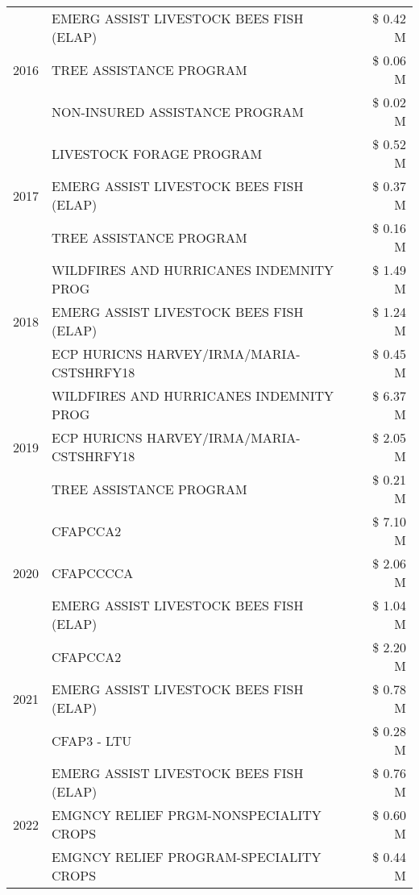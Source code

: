 \begin{tabular}{llr}
\multirow[t]{3}{*}{2016} & EMERG ASSIST LIVESTOCK BEES FISH (ELAP) & \$ 0.42 M \\
 & TREE ASSISTANCE PROGRAM & \$ 0.06 M \\
 & NON-INSURED ASSISTANCE PROGRAM & \$ 0.02 M \\
\cline{1-3}
\multirow[t]{3}{*}{2017} & LIVESTOCK FORAGE PROGRAM & \$ 0.52 M \\
 & EMERG ASSIST LIVESTOCK BEES FISH (ELAP) & \$ 0.37 M \\
 & TREE ASSISTANCE PROGRAM & \$ 0.16 M \\
\cline{1-3}
\multirow[t]{3}{*}{2018} & WILDFIRES AND HURRICANES INDEMNITY PROG & \$ 1.49 M \\
 & EMERG ASSIST LIVESTOCK BEES FISH (ELAP) & \$ 1.24 M \\
 & ECP HURICNS HARVEY/IRMA/MARIA-CSTSHRFY18 & \$ 0.45 M \\
\cline{1-3}
\multirow[t]{3}{*}{2019} & WILDFIRES AND HURRICANES INDEMNITY PROG & \$ 6.37 M \\
 & ECP HURICNS HARVEY/IRMA/MARIA-CSTSHRFY18 & \$ 2.05 M \\
 & TREE ASSISTANCE PROGRAM & \$ 0.21 M \\
\cline{1-3}
\multirow[t]{3}{*}{2020} & CFAPCCA2 & \$ 7.10 M \\
 & CFAPCCCCA & \$ 2.06 M \\
 & EMERG ASSIST LIVESTOCK BEES FISH (ELAP) & \$ 1.04 M \\
\cline{1-3}
\multirow[t]{3}{*}{2021} & CFAPCCA2 & \$ 2.20 M \\
 & EMERG ASSIST LIVESTOCK BEES FISH (ELAP) & \$ 0.78 M \\
 & CFAP3 - LTU & \$ 0.28 M \\
\cline{1-3}
\multirow[t]{3}{*}{2022} & EMERG ASSIST LIVESTOCK BEES FISH (ELAP) & \$ 0.76 M \\
 & EMGNCY RELIEF PRGM-NONSPECIALITY CROPS & \$ 0.60 M \\
 & EMGNCY RELIEF PROGRAM-SPECIALITY CROPS & \$ 0.44 M \\
\cline{1-3}
\bottomrule
\end{tabular}
